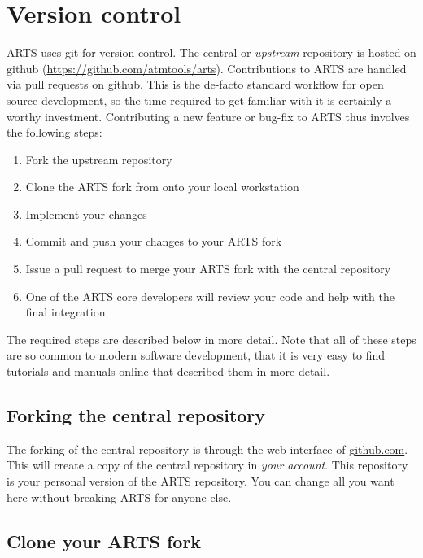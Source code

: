 \section{Version control}
\label{sec:development:cvs}

ARTS uses git for version control. The central or \textit{upstream} repository
is hosted on github (\url{https://github.com/atmtools/arts}). Contributions to
ARTS are handled via pull requests on github. This is the de-facto standard
workflow for open source development, so the time required to get familiar with
it is certainly a worthy investment. Contributing a new feature or bug-fix to
ARTS thus involves the following steps:

\begin{enumerate}
\item Fork the upstream repository
\item Clone the ARTS fork from  onto your local
  workstation
\item Implement your changes
\item Commit and push your changes to your ARTS fork
\item Issue a pull request to merge your ARTS fork with the central repository
\item One of the ARTS core developers will review your code and help with the
  final integration
\end{enumerate}


The required steps are described below in more detail. Note that all of these
steps are so common to modern software development, that it is very easy to find
tutorials and manuals online that described them in more detail.


\subsection{Forking the central repository}

The forking of the central repository is through the web interface of
\url{github.com}. This will create a copy of the central repository in
\textit{your account}. This repository is your personal version of the ARTS
repository. You can change all you want here without breaking ARTS for anyone
else.

\subsection{Clone your ARTS fork}

